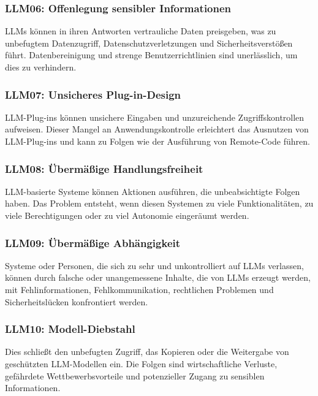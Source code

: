 \documentclass[
]{article}
\begin{document}
\subsubsection{LLM06: Offenlegung sensibler
Informationen}\label{llm06-offenlegung-sensibler-informationen}

LLMs können in ihren Antworten vertrauliche Daten preisgeben, was zu
unbefugtem Datenzugriff, Datenschutzverletzungen und
Sicherheitsverstößen führt. Datenbereinigung und strenge
Benutzerrichtlinien sind unerlässlich, um dies zu verhindern.

\subsubsection{LLM07: Unsicheres
Plug-in-Design}\label{llm07-unsicheres-plug-in-design}

LLM-Plug-ins können unsichere Eingaben und unzureichende
Zugriffskontrollen aufweisen. Dieser Mangel an Anwendungskontrolle
erleichtert das Ausnutzen von LLM-Plug-ins und kann zu Folgen wie der
Ausführung von Remote-Code führen.

\subsubsection{LLM08: Übermäßige
Handlungsfreiheit}\label{llm08-uxfcbermuxe4uxdfige-handlungsfreiheit}

LLM-basierte Systeme können Aktionen ausführen, die unbeabsichtigte
Folgen haben. Das Problem entsteht, wenn diesen Systemen zu viele
Funktionalitäten, zu viele Berechtigungen oder zu viel Autonomie
eingeräumt werden.

\subsubsection{LLM09: Übermäßige
Abhängigkeit}\label{llm09-uxfcbermuxe4uxdfige-abhuxe4ngigkeit}

Systeme oder Personen, die sich zu sehr und unkontrolliert auf LLMs
verlassen, können durch falsche oder unangemessene Inhalte, die von LLMs
erzeugt werden, mit Fehlinformationen, Fehlkommunikation, rechtlichen
Problemen und Sicherheitslücken konfrontiert werden.

\subsubsection{LLM10: Modell-Diebstahl}\label{llm10-modell-diebstahl}

Dies schließt den unbefugten Zugriff, das Kopieren oder die Weitergabe
von geschützten LLM-Modellen ein. Die Folgen sind wirtschaftliche
Verluste, gefährdete Wettbewerbsvorteile und potenzieller Zugang zu
sensiblen Informationen.
\end{document}
